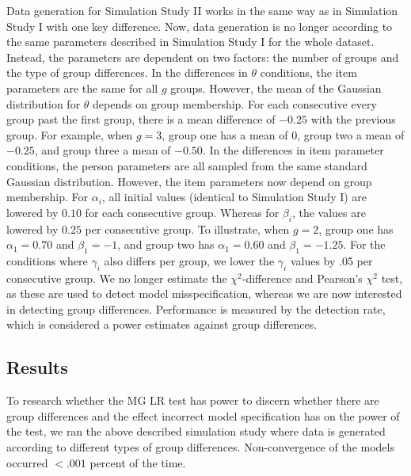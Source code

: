 \documentclass[Royal,sageapa,times,doublespace]{sagej}
\begin{document}
\indent Data generation for Simulation Study II works in the same way as in Simulation Study I with one key difference. Now, data generation is no longer according to the same parameters described in Simulation Study I for the whole dataset. Instead, the parameters are dependent on two factors: the number of groups and the type of group differences. In the differences in $\theta$ conditions, the item parameters are the same for all $g$ groups. However, the mean of the Gaussian distribution for $\theta$ depends on group membership. For each consecutive every group past the first group, there is a mean difference of $-0.25$ with the previous group. For example, when $g = 3$, group one has a mean of 0, group two a mean of $-0.25$, and group three a mean of $-0.50$. In the differences in item parameter conditions, the person parameters are all sampled from the same standard Gaussian distribution. However, the item parameters now depend on group membership. For $\alpha_i$, all initial values (identical to Simulation Study I) are lowered by $0.10$ for each consecutive group. Whereas for $\beta_i$, the values are lowered by $0.25$ per consecutive group. To illustrate, when $g = 2$, group one has $\alpha_1 = 0.70$ and $\beta_1 = -1$, and group two has $\alpha_1 = 0.60$ and $\beta_1 = -1.25$. For the conditions where $\gamma_i$ also differs per group, we lower the $\gamma_i$ values by .05 per consecutive group. We no longer estimate the $\chi^2$-difference and Pearson's $\chi^2$ test, as these are used to detect model misspecification, whereas we are now interested in detecting group differences. Performance is measured by the detection rate, which is considered a power estimates against group differences.

\subsection{Results}

To research whether the MG LR test has power to discern whether there are group differences and the effect incorrect model specification has on the power of the test, we ran the above described simulation study where data is generated according to different types of group differences. Non-convergence of the models occurred $<.001$ percent of the time.
\end{document}
